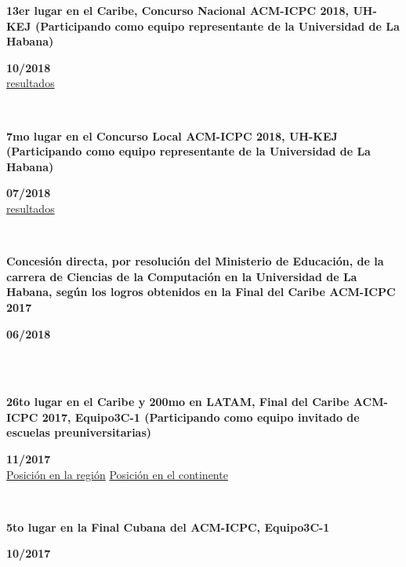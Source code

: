 \documentclass{article}
\begin{document}
\begin{minipage}{0.8\textwidth}
\parbox{0.8\linewidth}{\textbf{13er lugar en el Caribe, Concurso Nacional ACM-ICPC 2018, UH-KEJ (Participando como equipo representante de la Universidad de La Habana)}} \hfill \textbf{10/2018}\\
\href{https://icpc.global/regionals/finder/cnc-2018/standings}{resultados}
\\
\end{minipage} \hfill {}\\
\begin{minipage}{0.8\textwidth}
\parbox{0.8\linewidth}{\textbf{7mo lugar en el Concurso Local ACM-ICPC 2018, UH-KEJ (Participando como equipo representante de la Universidad de La Habana)}} \hfill \textbf{07/2018}\\
\href{https://matcomgrader.com/post/5179/resultados-del-concurso-local-caribeno-2018}{resultados}
\\
\end{minipage} \hfill {}\\
\begin{minipage}{0.8\textwidth}
\parbox{0.8\linewidth}{\textbf{Concesión directa, por resolución del Ministerio de Educación, de la carrera de Ciencias de la Computación en la Universidad de La Habana, según los logros obtenidos en la Final del Caribe ACM-ICPC 2017}} \hfill \textbf{06/2018}\\
\\
\end{minipage} \\
\begin{minipage}{0.8\textwidth}
\parbox{0.8\linewidth}{\textbf{26to lugar en el Caribe y 200mo en LATAM, Final del Caribe ACM-ICPC 2017, Equipo3C-1 (Participando como equipo invitado de escuelas preuniversitarias)}} \hfill \textbf{11/2017}\\
\href{https://matcomgrader.com/media/posts/5167/ranking/caribbean.png}{Posición en la región}
\href{https://matcomgrader.com/media/posts/5167/ranking/general.png}{Posición en el continente}
\\
\end{minipage} \hfill {}\\
\begin{minipage}{0.8\textwidth}
\parbox{0.8\linewidth}{\textbf{5to lugar en la Final Cubana del ACM-ICPC, Equipo3C-1}} \hfill \textbf{10/2017}\\
\\
\end{minipage}\\
\end{document}
